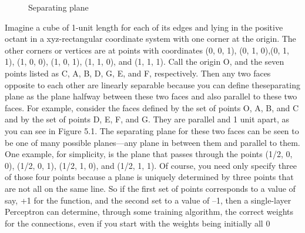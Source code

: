 \documentclass[12pt, right open]{memoir}
\begin{document}
\newcommand{\Depth}{4}
\newcommand{\Height}{4}
\newcommand{\Width}{4}
\begin{figure}
\centering
\caption{Separating plane}
\label{fig:separating_plane}
\end{figure}

Imagine a cube of 1-unit length for each of its edges and lying in the positive octant in a xyz-rectangular coordinate system with one corner at the origin.
The other corners or vertices are at points with coordinates (0, 0, 1), (0, 1, 0),(0, 1, 1), (1, 0, 0), (1, 0, 1), (1, 1, 0), and (1, 1, 1). Call the origin O, and the seven points listed as C, A, B, D, G, E, and F, respectively. Then any two faces
opposite to each other are linearly separable because you can define theseparating plane as the plane halfway between these two faces and also parallel to these two faces.
For example, consider the faces defined by the set of points O, A, B, and C and
by the set of points D, E, F, and G. They are parallel and 1 unit apart, as you
can see in Figure 5.1. The separating plane for these two faces can be seen to
be one of many possible planes—any plane in between them and parallel to
them. One example, for simplicity, is the plane that passes through the points
(1/2, 0, 0), (1/2, 0, 1), (1/2, 1, 0), and (1/2, 1, 1). Of course, you need only
specify three of those four points because a plane is uniquely determined by
three points that are not all on the same line. So if the first set of points
corresponds to a value of say, +1 for the function, and the second set to a value
of –1, then a single-layer Perceptron can determine, through some training
algorithm, the correct weights for the connections, even if you start with the
weights being initially all 0
\end{document}
